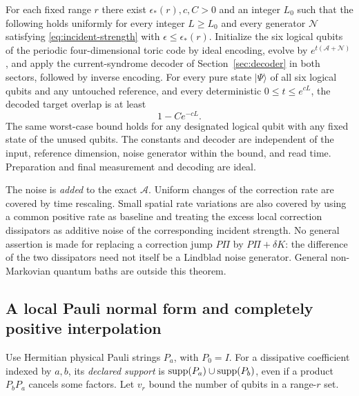 \begin{theorem}\label{thm:general}
For each fixed range \(r\) there exist
\(\epsilon_*(r),c,C>0\) and an integer \(L_0\) such that the following
holds uniformly for every integer \(L\ge L_0\) and every generator
\(\mathcal N\) satisfying \eqref{eq:incident-strength} with
\(\epsilon\le\epsilon_*(r)\).
Initialize the six logical qubits of the periodic four-dimensional
toric code by ideal encoding, evolve by
\(e^{t(\mathcal A+\mathcal N)}\), and apply the current-syndrome
decoder of Section~\ref{sec:decoder} in both sectors, followed by
inverse encoding. For every pure state \(|\Psi\rangle\) of all six
logical qubits and any untouched reference, and every deterministic
\(0\le t\le e^{cL}\), the decoded target overlap is at least
\begin{equation}\label{eq:general-fidelity}
 1-Ce^{-cL}.
\end{equation}
The same worst-case bound holds for any designated logical qubit
with any fixed state of the unused qubits.
The constants and decoder are independent of the input,
reference dimension, noise generator within the bound, and read
time. Preparation and final measurement and decoding are ideal.
\end{theorem}

The noise is \emph{added} to the exact \(\mathcal A\).
Uniform changes of the correction rate are covered by time rescaling.
Small spatial rate variations are also covered by using a common
positive rate as baseline and treating the excess local correction
dissipators as additive noise of the corresponding incident strength.
No general assertion is made for replacing a correction jump
\(P\Pi\) by \(P\Pi+\delta K\): the difference of the two
dissipators need not itself be a Lindblad noise generator.
General non-Markovian quantum baths are outside this theorem.

\subsection{A local Pauli normal form and completely positive interpolation}

Use Hermitian physical Pauli strings \(P_a\), with \(P_0=I\).
For a dissipative coefficient indexed by \(a,b\), its
\emph{declared support} is
\(\operatorname{supp}(P_a)\cup\operatorname{supp}(P_b)\), even if a product \(P_bP_a\)
cancels some factors. Let \(v_r\) bound the number of qubits in a
range-\(r\) set.

